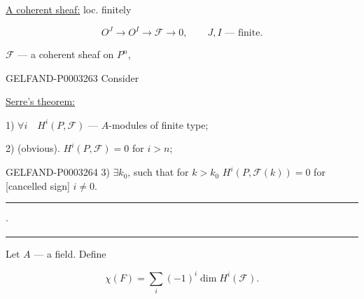 \uline{A coherent sheaf:} loc. finitely

\begin{equation*}O^J\longrightarrow O^I\longrightarrow\mathcal F\longrightarrow0,\qquad J, I\text{ --- finite}.\end{equation*}

$\mathcal F$ --- a coherent sheaf on $P^n$,

\begin{GelfandAdjacentEvidence}{GELFAND-P000326}{3}
Consider





\end{GelfandAdjacentEvidence}


\uline{\uline{Serre’s theorem:}}

1) $\forall i\quad H^i (P,\mathcal F)$ --- $A$-modules of finite type;

2) (obvious). $H^i (P,\mathcal F)=0$ for $i>n$;

\begin{GelfandAdjacentEvidence}{GELFAND-P000326}{4}
3) $\exists k_0$, such that for $k>k_0$ $H^i (P,\mathcal F (k))=0$ for [cancelled sign] $i\ne0$.

\end{GelfandAdjacentEvidence}


\begin{center}\rule{20mm}{.4pt}\quad $\cdot$\quad\rule{20mm}{.4pt}\end{center}

Let $A$ --- a field. Define

\begin{equation*}\chi (F)=\sum_i (-1)^i\dim H^i (\mathcal F).\end{equation*}

